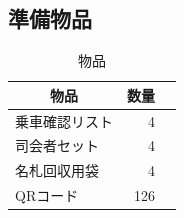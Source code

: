 \normalsize

\subsection{準備物品}
\begin{table}[h]
  \centering
  \caption{物品}
  \begin{tabular}{lrl}
    \hline
    \multicolumn{1}{c}{物品} & \multicolumn{1}{c}{数量} \\
    \hline
    乗車確認リスト & 4  \\
    司会者セット & 4 \\
    名札回収用袋 & 4 \\
    QRコード & 126 \\
    \hline  
  \end{tabular}
\end{table}